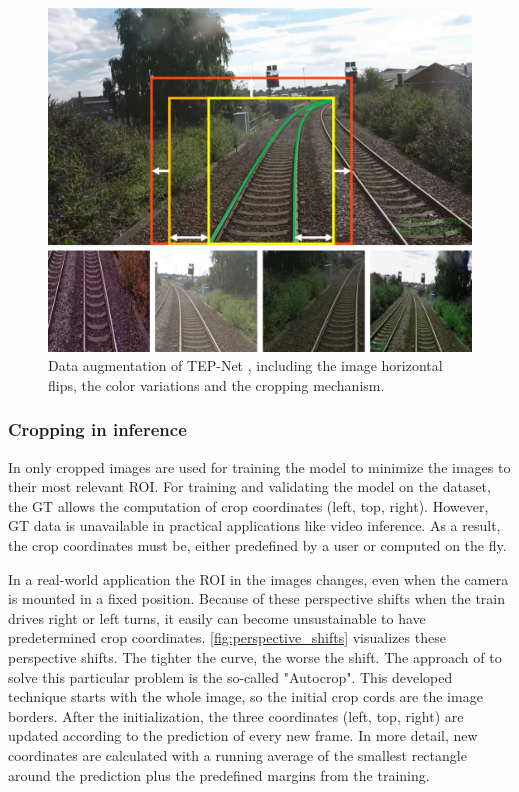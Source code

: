 \begin{figure}[H]
    \centering
    \includegraphics[width=\linewidth]{PICs/Baselinepaper/data_augmenation.jpg}
    \caption{Data augmentation of \ac{TEP}-Net \cite{tepNet2024}, including the image horizontal flips, the color variations and the cropping mechanism.}
    \label{fig:tepNet_dataaugmentation}
\end{figure}

\subsubsection{Cropping in inference}

In \cite{tepNet2024} only cropped images are used for training the model to minimize the images to their most relevant \ac{ROI}.
For training and validating the model on the dataset, the \ac{GT} allows the computation of crop coordinates (left, top, right).
However, \ac{GT} data is unavailable in practical applications like video inference.
As a result, the crop coordinates must be, either predefined by a user or computed on the fly.

In a real-world application the ROI in the images changes, even when the camera is mounted in a fixed position.
Because of these perspective shifts when the train drives right or left turns, it easily can become unsustainable to have predetermined crop coordinates.
\autoref{fig:perspective_shifts} visualizes these perspective shifts.
The tighter the curve, the worse the shift.
The approach of \cite{tepNet2024} to solve this particular problem is the so-called "Autocrop".
This developed technique starts with the whole image, so the initial crop cords are the image borders.
After the initialization, the three coordinates (left, top, right) are updated according to the prediction of every new frame.
In more detail, new coordinates are calculated with a running average of the smallest rectangle around the prediction plus the predefined margins from the training.

